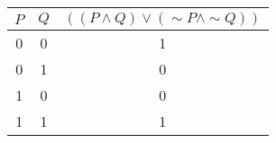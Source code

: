 \begin{tabular}{|c|c||c|}
\hline
$ P $ & $ Q $ & $ ((P \wedge Q) \vee ( \sim P \wedge  \sim Q)) $ \\
\hline
0 & 0 & 1 \\
0 & 1 & 0 \\
1 & 0 & 0 \\
1 & 1 & 1 \\
\hline
\end{tabular}
\label{table:tt1}
